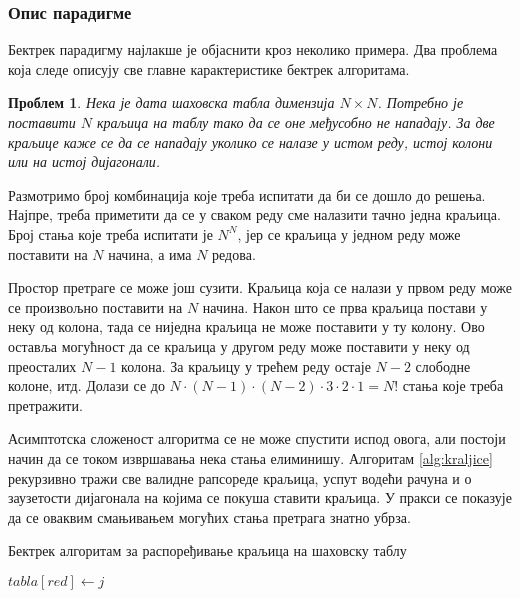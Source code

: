 \documentclass[a4paper, 12pt, ngerman]{article}
\newtheorem{problem}{Проблем}
\begin{document}
\subsubsection{Опис парадигме}
Бектрек парадигму најлакше је објаснити кроз неколико примера. Два проблема која следе описују све главне карактеристике бектрек алгоритама.

\begin{problem}
Нека је дата шаховска табла димензија $N \times N$. Потребно је поставити $N$ краљица на таблу тако да се оне међусобно не нападају. За две краљице каже се да се нападају уколико се налазе у истом реду, истој колони или на истој дијагонали.
\end{problem}

Размотримо број комбинација које треба испитати да би се дошло до решења. Најпре, треба приметити да се у сваком реду сме налазити тачно једна краљица. Број стања које треба испитати је $N^N$, јер се краљица у једном реду може поставити на $N$ начина, а има $N$ редова.

Простор претраге се може још сузити. Краљица која се налази у првом реду може се произвољно поставити на $N$ начина. Након што се прва краљица постави у неку од колона, тада се ниједна краљица не може поставити у ту колону. Ово оставља могућност да се краљица у другом реду може поставити у неку од преосталих $N - 1$ колона. За краљицу у трећем реду остаје $N - 2$ слободне колоне, итд. Долази се до $N \cdot (N-1) \cdot (N-2) \cdot 3 \cdot 2 \cdot 1 = N!$ стања које треба претражити.

Асимптотска сложеност алгоритма се не може спустити испод овога, али постоји начин да се током извршавања нека стања елиминишу. Алгоритам \ref{alg:kraljice} рекурзивно тражи све валидне рапсореде краљица, успут водећи рачуна и о заузетости дијагонала на којима се покуша ставити краљица. У пракси се показује да се оваквим смањивањем могућих стања претрага знатно убрза. 

\begin{algorithm}[htbp]
\caption{Бектрек алгоритам за распоређивање краљица на шаховску таблу}
\label{alg:kraljice}
\begin{algorithmic}
		\State{} 
	\EndIf
			\Continue
		\EndIf
			\Continue
		\EndIf
			\Continue
		\EndIf
		\State{}
		\State{}
		\State{}
		\State $tabla[red] \gets j$
		\State{}
		\State{}
		\State{}
		\State{}
		\EndFor
	\EndFunction
\end{algorithmic}
\end{algorithm}
\end{document}

